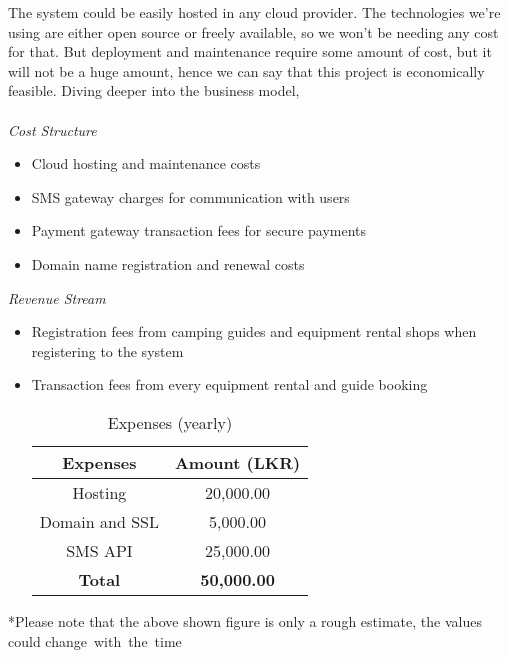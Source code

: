 The system could be easily hosted in any cloud provider. The technologies we’re using are either open source or freely available, so we won't be needing any cost for that. But deployment and maintenance require some amount of cost, but it will not be a huge amount, hence we can say that this project is economically feasible.
Diving deeper into the business model,\\ \\
\textit{Cost Structure}
\begin{itemize}
\itemsep0em 
    \item Cloud hosting and maintenance costs
    \item SMS gateway charges for communication with users
    \item Payment gateway transaction fees for secure payments
    \item Domain name registration and renewal costs
\end{itemize}
\textit{Revenue Stream}
\begin{itemize}
    \item Registration fees from camping guides and equipment rental shops when  registering to the system
    \item Transaction fees from every equipment rental and guide booking

    \begin{table}[ht]
    \centering


    \begin{tabular}{|c|c|}
        \hline
        Expenses & Amount (LKR) \\
        \hline
        Hosting & 20,000.00  \\
        Domain and SSL & 5,000.00 \\
        SMS API & 25,000.00 \\
        \hline
        \textbf{Total} & \textbf{50,000.00} \\
        \hline
    \end{tabular}
    \label{tab:expenses}
    \caption{Expenses (yearly)}
\end{table}
\end{itemize}
*Please note that the above shown figure is only a rough estimate, the values could change with the time

